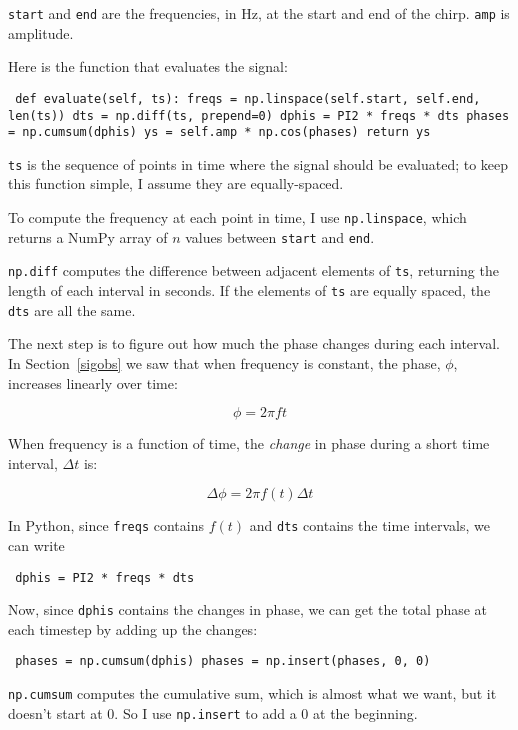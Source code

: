 \documentclass[12pt]{book} \usepackage[width=5.5in,height=8.5in, hmarginratio=3:2,vmarginratio=1:1]{geometry}
\begin{document}
{\tt start} and {\tt end} are the frequencies, in Hz, at the start and end of the chirp. {\tt amp} is amplitude. 

Here is the function that evaluates the signal: 

\begin{verbatim} def evaluate(self, ts): freqs = np.linspace(self.start, self.end, len(ts)) dts = np.diff(ts, prepend=0) dphis = PI2 * freqs * dts phases = np.cumsum(dphis) ys = self.amp * np.cos(phases) return ys \end{verbatim} 

{\tt ts} is the sequence of points in time where the signal should be evaluated; to keep this function simple, I assume they are equally-spaced. 

To compute the frequency at each point in time, I use {\tt np.linspace}, which returns a NumPy array of $n$ values between {\tt start} and {\tt end}. 

{\tt np.diff} computes the difference between adjacent elements of {\tt ts}, returning the length of each interval in seconds. If the elements of {\tt ts} are equally spaced, the {\tt dts} are all the same. 

The next step is to figure out how much the phase changes during each interval. In Section~\ref{sigobs} we saw that when frequency is constant, the phase, $\phi$, increases linearly over time: 

%
\[ \phi = 2 \pi f t \] 

%
When frequency is a function of time, the {\em change} in phase during a short time interval, $\Delta t$ is: 

%
\[ \Delta \phi = 2 \pi f(t) \Delta t \] 

%
In Python, since {\tt freqs} contains $f(t)$ and {\tt dts} contains the time intervals, we can write 

\begin{verbatim} dphis = PI2 * freqs * dts \end{verbatim} 

Now, since {\tt dphis} contains the changes in phase, we can get the total phase at each timestep by adding up the changes: 

\begin{verbatim} phases = np.cumsum(dphis) phases = np.insert(phases, 0, 0) \end{verbatim} 

{\tt np.cumsum} computes the cumulative sum, which is almost what we want, but it doesn't start at 0. So I use {\tt np.insert} to add a 0 at the beginning. 
\end{document}
